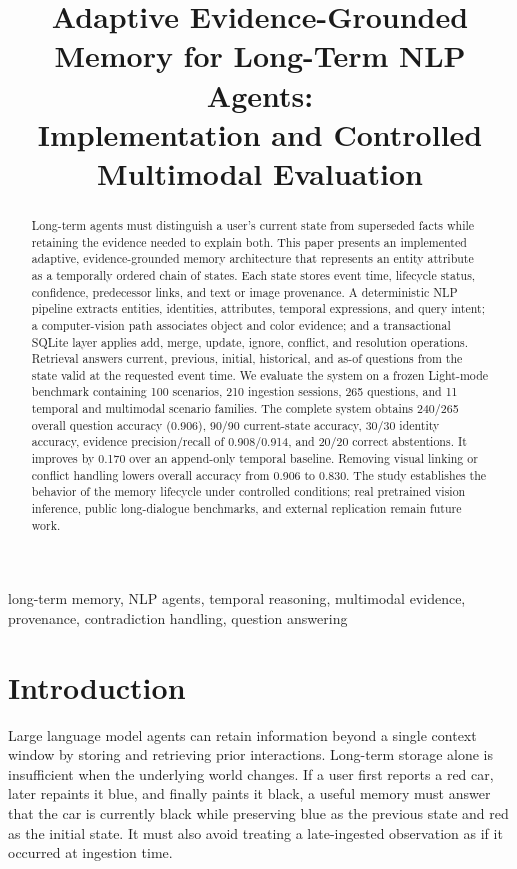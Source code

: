 \documentclass[conference]{IEEEtran}
\title{Adaptive Evidence-Grounded Memory for Long-Term NLP Agents:\\Implementation and Controlled Multimodal Evaluation}
\author{
\IEEEauthorblockN{Dhanush S, Dhruthi R Kulkarni, E Sasi Vaishnav, Jathin K N}
\IEEEauthorblockA{Department of Computer Science and Engineering\\
RV University, Bengaluru, India}
}
\begin{document}
\maketitle

\begin{abstract}
Long-term agents must distinguish a user's current state from superseded facts while retaining the evidence needed to explain both. This paper presents an implemented adaptive, evidence-grounded memory architecture that represents an entity attribute as a temporally ordered chain of states. Each state stores event time, lifecycle status, confidence, predecessor links, and text or image provenance. A deterministic NLP pipeline extracts entities, identities, attributes, temporal expressions, and query intent; a computer-vision path associates object and color evidence; and a transactional SQLite layer applies add, merge, update, ignore, conflict, and resolution operations. Retrieval answers current, previous, initial, historical, and as-of questions from the state valid at the requested event time. We evaluate the system on a frozen Light-mode benchmark containing 100 scenarios, 210 ingestion sessions, 265 questions, and 11 temporal and multimodal scenario families. The complete system obtains 240/265 overall question accuracy (0.906), 90/90 current-state accuracy, 30/30 identity accuracy, evidence precision/recall of 0.908/0.914, and 20/20 correct abstentions. It improves by 0.170 over an append-only temporal baseline. Removing visual linking or conflict handling lowers overall accuracy from 0.906 to 0.830. The study establishes the behavior of the memory lifecycle under controlled conditions; real pretrained vision inference, public long-dialogue benchmarks, and external replication remain future work.
\end{abstract}

\begin{IEEEkeywords}
long-term memory, NLP agents, temporal reasoning, multimodal evidence, provenance, contradiction handling, question answering
\end{IEEEkeywords}

\section{Introduction}
Large language model agents can retain information beyond a single context window by storing and retrieving prior interactions. Long-term storage alone is insufficient when the underlying world changes. If a user first reports a red car, later repaints it blue, and finally paints it black, a useful memory must answer that the car is currently black while preserving blue as the previous state and red as the initial state. It must also avoid treating a late-ingested observation as if it occurred at ingestion time.
\end{document}
